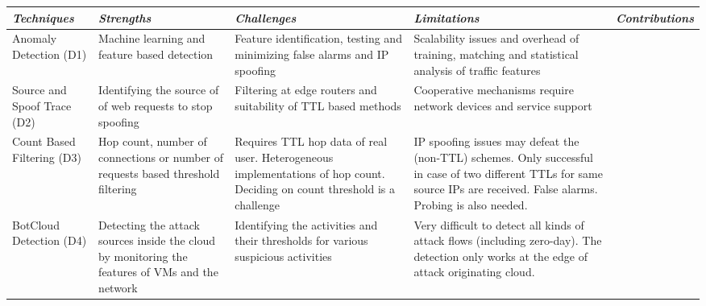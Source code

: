 \documentclass[final,5p,times,twocolumn]{elsarticle}
\begin{document}
\begin{table*}[htb]
\vspace{-3mm}
\begin{center}

\centering
{
\begin{tabular}{|l|l|l|l|l|}\hline
{\it \bf  Techniques}	&	{\it \bf Strengths }	& 	{\it \bf Challenges} 			& {\it \bf Limitations} & {\it \bf Contributions} \\ \hline

 \parbox{2cm}{Anomaly Detection (D1)}  		& \parbox{3.5cm}{Machine learning and feature based detection}  & \parbox{3.5cm}{ Feature identification, testing and minimizing false alarms and IP spoofing }  &  \parbox{4cm}{Scalability issues and overhead of training, matching and statistical analysis of traffic features} &  \parbox{2cm}{\cite{idziorekdetecting}\cite{covariance}\cite{statistical}  \cite{Idziorek11}\cite{shamsolmoali2014statistical}\cite{gomez2000analysis} \cite{templeton2003detecting}\cite{cbf}\cite{jeyanthi}  \cite{edosarmor}\cite{ddosdefense} \cite{timespent}}\\ \hline

\parbox{2cm}{Source and Spoof Trace (D2) }  		& \parbox{3.5cm}{Identifying the source of of web requests to stop spoofing}  & \parbox{3.5cm}{Filtering at edge routers and suitability of TTL based methods}  &  \parbox{4cm}{Cooperative mechanisms require network devices and service support } &  \parbox{2cm}{\cite{yu2016feasible}\cite{chonka}\cite{botnetsurveysilva} \cite{yang}\cite{osanaiye2015short}\cite{sourceauthentication} \cite{multistage}\cite{luo2013preventing}\cite{law2005you}}\\\hline

\parbox{2cm}{Count Based Filtering (D3)}  		& \parbox{3.5cm}{Hop count, number of connections or number of requests based threshold filtering }  & \parbox{3.5cm}{Requires TTL hop data of real user. Heterogeneous implementations of hop count. Deciding on count threshold is  a challenge}  &  \parbox{4cm}{ IP spoofing issues may defeat  the (non-TTL) schemes. Only successful in case of two different  TTLs for same source IPs are received. False alarms. Probing is also needed. } &  \parbox{2cm}{\cite{comber}\cite{enhanced}\cite{edosshield}  \cite{index}\cite{army}\cite{deflate}}\\\hline


\parbox{2cm}{BotCloud Detection (D4)}  		& \parbox{3.5cm}{Detecting the attack sources inside the cloud by monitoring the features of VMs and the network}  & \parbox{3.5cm}{Identifying the activities and their thresholds for various suspicious activities}  &  \parbox{4cm}{Very difficult to detect all kinds of attack flows (including zero-day). The detection only works at the edge of attack originating cloud.} &  \parbox{2cm}{\cite{latanicki}\cite{youcant}\cite{botcloudGraham} \cite{botcloudBadis}\cite{mauro2}}\\\hline


\end{tabular}}
\end{center}
\end{table*}
\end{document}
